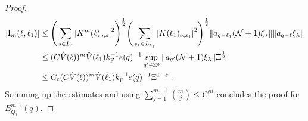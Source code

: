 \documentclass[12pt,a4paper]{article}
\numberwithin{equation}{section}
\newcommand{\1}{\mathbb{I}}
\newcommand{\F}{\mathrm{F}}
\newcommand{\I}{\mathrm{I}}
\newcommand{\kF}{k_\F}
\newcommand{\Z}{\mathbb{Z}}
\newcommand{\NN}{\mathcal{N}}
\newcommand{\half}{\frac{1}{2}}
\theoremstyle{plain}
\theoremstyle{definition}
\theoremstyle{remark}
\theoremstyle{plain}
\theoremstyle{definition}
\theoremstyle{remark}
\begin{document}
\begin{proof}
\begin{align}
	|\I_m(\ell, \ell_1)|
	&\leq \Bigg(\sum\limits_{s \in L_{\ell}} \abs{K^m(\ell)_{q,s}}^2\Bigg)^\half \Bigg(\sum\limits_{s_1 \in L_{\ell_1}} \abs{K(\ell_1)_{q,s_1}}^2\Bigg)^\half \norm{ a_{q-\ell_1} (\NN+1)\xi_\lambda} \norm{ a_{q-\ell}\xi_\lambda }\nonumber\\
	&\leq (C \hat{V}(\ell))^m \hat{V}(\ell_1) \kF^{-1} e(q)^{-1} \sup_{q' \in \Z^3}\norm{ a_{q'} (\NN+1) \xi_\lambda}\Xi^\half\nonumber\\
	&\leq C_\varepsilon (C \hat{V}(\ell))^m \hat{V}(\ell_1) \kF^{-1} e(q)^{-1} \Xi^{1-\varepsilon} \;. \label{eq:estEQ1113}
\end{align}
Summing up the estimates and using $\sum_{j=1}^{m-1} {{m}\choose j} \le C^m $ concludes the proof for $ E^{m,1}_{Q_1}(q) $.


\end{proof}
\end{document}

